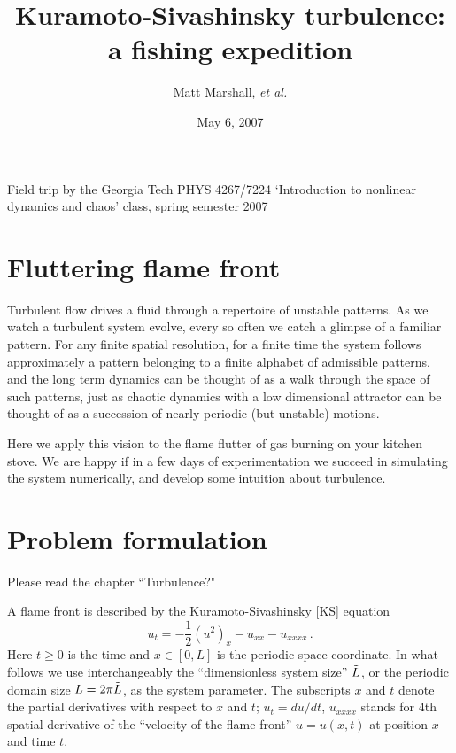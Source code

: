 \documentclass[letterpaper,10pt,fleqn,notitlepage]{article}
\title{Kuramoto-Sivashinsky turbulence:
       \\ a fishing expedition}
\author{Matt Marshall, %
        {\em  et al.}
        }
\date{May 6, 2007}
\begin{document}
\maketitle

 Field trip by the 
Georgia Tech PHYS 4267/7224 `Introduction to nonlinear dynamics and chaos'
class, spring semester 2007

\section{Fluttering flame front}

Turbulent flow drives a fluid through a
repertoire of unstable patterns.
As we watch a turbulent system evolve, 
every so often we catch a glimpse of a familiar pattern. 
For any finite  spatial resolution, for a finite time 
the system follows approximately
a pattern belonging to a finite 
alphabet of admissible patterns, and the long term dynamics can be thought
of as a walk through the space of such patterns,
just as chaotic dynamics with a  low dimensional
attractor can be thought of as a succession of nearly periodic (but
unstable) motions.

Here we apply this vision to
the flame flutter of gas burning 
on your kitchen stove. 
We are happy if in a few days of experimentation we succeed in simulating
the system numerically, and develop some intuition about turbulence.

\section{Problem formulation}

\noindent
Please read the chapter ``Turbulence?"

A flame front is
described by the Kuramoto-Sivashinsky [KS] equation
\begin{equation}
u_t= - \frac{1}{2}(u^2)_x-u_{xx}-u_{xxxx} 
\,.
\label{ks}
\end{equation}
Here $t \geq 0$ is the time and
$x \in [0,L]$ is the periodic space coordinate.
In what follows we use interchangeably the ``dimensionless
system size'' $\tilde{L}$, or the periodic domain size $L= 2\pi \tilde{L}$,
as the system parameter.
The subscripts $x$ and $t$ denote the partial derivatives with respect to 
$x$ and $t$;
$u_t = du/dt$, $u_{xxxx}$ stands for 4th spatial
derivative of the ``velocity of the flame front''
$u=u(x,t)$ at position $x$ and time $t$. 
\end{document}

